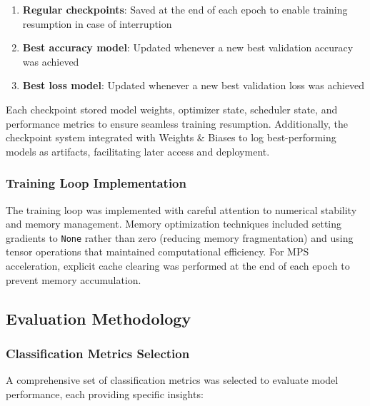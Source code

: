 \documentclass[12pt, a4paper]{article}
\begin{document}
\begin{enumerate}
    \item \textbf{Regular checkpoints}: Saved at the end of each epoch to enable training resumption in case of interruption
    \item \textbf{Best accuracy model}: Updated whenever a new best validation accuracy was achieved
    \item \textbf{Best loss model}: Updated whenever a new best validation loss was achieved
\end{enumerate}

Each checkpoint stored model weights, optimizer state, scheduler state, and performance metrics to ensure seamless training resumption. Additionally, the checkpoint system integrated with Weights \& Biases to log best-performing models as artifacts, facilitating later access and deployment.

\subsubsection{Training Loop Implementation}

The training loop was implemented with careful attention to numerical stability and memory management. Memory optimization techniques included setting gradients to \texttt{None} rather than zero (reducing memory fragmentation) and using tensor operations that maintained computational efficiency. For MPS acceleration, explicit cache clearing was performed at the end of each epoch to prevent memory accumulation.

\subsection{Evaluation Methodology}

\subsubsection{Classification Metrics Selection}

A comprehensive set of classification metrics was selected to evaluate model performance, each providing specific insights:
\end{document}
